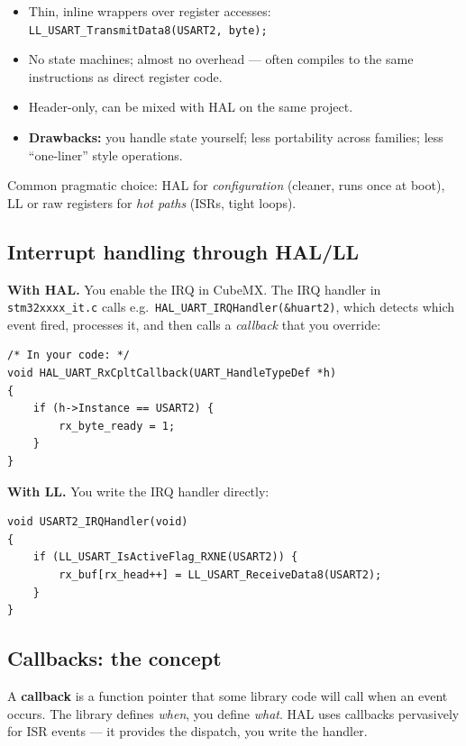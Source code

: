 \documentclass[11pt,a4paper]{article}
\begin{document}
\begin{itemize}[leftmargin=*]
    \item Thin, inline wrappers over register accesses:
    \texttt{LL\_USART\_TransmitData8(USART2, byte);}
    \item No state machines; almost no overhead --- often compiles to the
    same instructions as direct register code.
    \item Header-only, can be mixed with HAL on the same project.
    \item \textbf{Drawbacks:} you handle state yourself; less portability
    across families; less ``one-liner'' style operations.
\end{itemize}

\begin{note}
Common pragmatic choice: HAL for \emph{configuration} (cleaner, runs once
at boot), LL or raw registers for \emph{hot paths} (ISRs, tight loops).
\end{note}

\subsection{Interrupt handling through HAL/LL}

\textbf{With HAL.} You enable the IRQ in CubeMX. The IRQ handler in
\texttt{stm32xxxx\_it.c} calls e.g.\ \texttt{HAL\_UART\_IRQHandler(\&huart2)},
which detects which event fired, processes it, and then calls a
\emph{callback} that you override:
\begin{lstlisting}[style=C]
/* In your code: */
void HAL_UART_RxCpltCallback(UART_HandleTypeDef *h)
{
    if (h->Instance == USART2) {
        rx_byte_ready = 1;
    }
}
\end{lstlisting}

\textbf{With LL.} You write the IRQ handler directly:
\begin{lstlisting}[style=C]
void USART2_IRQHandler(void)
{
    if (LL_USART_IsActiveFlag_RXNE(USART2)) {
        rx_buf[rx_head++] = LL_USART_ReceiveData8(USART2);
    }
}
\end{lstlisting}

\subsection{Callbacks: the concept}

A \textbf{callback} is a function pointer that some library code will call
when an event occurs. The library defines \emph{when}, you define \emph{what}.
HAL uses callbacks pervasively for ISR events --- it provides the dispatch,
you write the handler.
\end{document}
